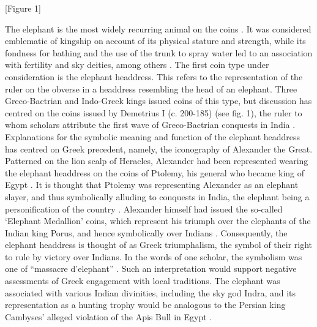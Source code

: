 \documentclass{ijsra}
\begin{document}
[Figure 1]

The elephant is the most widely recurring animal on the coins \parencite[383--384]{Bopearachchi1991}.
It was considered emblematic of kingship on account of its physical stature and strength,
while its fondness for bathing and the use of the trunk to spray water led to an association with fertility and sky deities,
among others \parencites[15--19]{Gupta1983}[156]{Iossif2010}.
The first coin type under consideration is the elephant headdress.
This refers to the representation of the ruler on the obverse in a headdress resembling the head of an elephant.
Three Greco-Bactrian and Indo-Greek kings issued coins of this type, but discussion has centred on the coins issued by Demetrius I
(c. 200-185\BC) (see fig. 1), the ruler to whom scholars attribute the first wave of Greco-Bactrian conquests in India
\parencites[47--48]{Bopearachchi2011}[17--18]{Kalita1997}.
Explanations for the symbolic meaning and function of the elephant headdress has centred on Greek precedent,
namely, the iconography of Alexander the Great.
Patterned on the lion scalp of Heracles, Alexander had been represented wearing the elephant headdress on the coins of Ptolemy,
his general who became king of Egypt \parencite[21--31]{Lorber2012}.
It is thought that Ptolemy was representing Alexander as an elephant slayer, and thus symbolically alluding to conquests in India,
the elephant being a personification of the country \parencites[50]{Curtis2007}[335]{Green1993}[104--105]{MacDowall2007a}.
Alexander himself had issued the so-called ‘Elephant Medallion’ coins, which represent his triumph over the elephants of the Indian
king Porus, and hence symbolically over Indians \parencite[151--152]{Holt2003}.
Consequently, the elephant headdress is thought of as Greek triumphalism, the symbol of their right to rule by victory over Indians.
In the words of one scholar, the symbolism was one of “massacre d’elephant” \parencite[232, 492]{Widemann2009}.
Such an interpretation would support negative assessments of Greek engagement with local traditions.
The elephant was associated with various Indian divinities, including the sky god Indra, and its representation as a hunting trophy
would be analogous to the Persian king Cambyses’ alleged violation of the Apis Bull in Egypt \parencite[15--19]{Gupta1983}.
\end{document}
